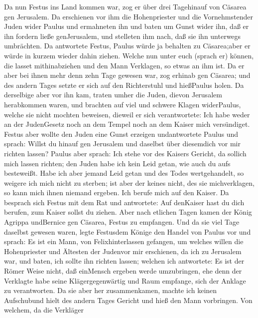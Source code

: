  Da nun Festus ins Land kommen war, zog er über drei
Tagehinauf von Cäsarea gen Jerusalem.  Da erschienen vor ihm
die Hohenpriester und die Vornehmstender Juden wider Paulus und
ermahneten ihn  und baten um Gunst wider ihn, daß er ihn
fordern ließe genJerusalem, und stelleten ihm nach, daß sie ihn
unterwegs umbrächten.  Da antwortete Festus, Paulus würde ja
behalten zu Cäsarea;aber er würde in kurzem wieder dahin ziehen.
 Welche nun unter euch (sprach er) können, die lasset
mithinabziehen und den Mann Verklagen, so etwas an ihm ist. 
Da er aber bei ihnen mehr denn zehn Tage gewesen war, zog erhinab gen
Cäsarea; und des andern Tages setzte er sich auf den Richterstuhl und
hießPaulus holen.  Da derselbige aber vor ihn kam, traten
umher die Juden, dievon Jerusalem herabkommen waren, und brachten auf
viel und schwere Klagen widerPaulus, welche sie nicht mochten beweisen,
 dieweil er sich verantwortete: Ich habe weder an der
JudenGesetz noch an dem Tempel noch an dem Kaiser mich versündiget.
 Festus aber wollte den Juden eine Gunst erzeigen
undantwortete Paulus und sprach: Willst du hinauf gen Jerusalem und
daselbst über diesemdich vor mir richten lassen?  Paulus
aber sprach: Ich stehe vor des Kaisers Gericht, da sollich mich lassen
richten; den Juden habe ich kein Leid getan, wie auch du aufs
besteweißt.  Habe ich aber jemand Leid getan und des Todes
wertgehandelt, so weigere ich mich nicht zu sterben; ist aber der keines
nicht, des sie michverklagen, so kann mich ihnen niemand ergeben. Ich
berufe mich auf den Kaiser.  Da besprach sich Festus mit
dem Rat und antwortete: Auf denKaiser hast du dich berufen, zum Kaiser
sollst du ziehen.  Aber nach etlichen Tagen kamen der König
Agrippa undBernice gen Cäsarea, Festus zu empfangen.  Und
da sie viel Tage daselbst gewesen waren, legte Festusdem Könige den
Handel von Paulus vor und sprach: Es ist ein Mann, von Felixhinterlassen
gefangen,  um welches willen die Hohenpriester und Ältesten
der Judenvor mir erschienen, da ich zu Jerusalem war, und baten, ich
sollte ihn richten lassen;  welchen ich antwortete: Es ist
der Römer Weise nicht, daß einMensch ergeben werde umzubringen, ehe denn
der Verklagte habe seine Klägergegenwärtig und Raum empfange, sich der
Anklage zu verantworten.  Da sie aber her zusammenkamen,
machte ich keinen Aufschubund hielt des andern Tages Gericht und hieß
den Mann vorbringen.  Von welchem, da die Verkläger
